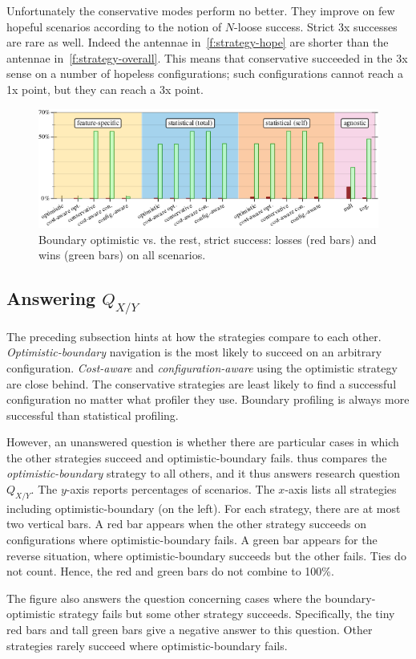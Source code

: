 Unfortunately the conservative modes perform no better.  They improve on few
hopeful scenarios according to the notion of $N$-loose success.  Strict 3x
successes are rare as well.  Indeed the antennae in~\cref{f:strategy-hope}
are shorter than the antennae in~\cref{f:strategy-overall}.  This means that
conservative succeeded in the 3x sense on a number of hopeless configurations;
such configurations cannot reach a 1x point, but they can reach a 3x point.


\begin{figure}[ht]
  \includegraphics[width=0.9\columnwidth]{data/head-to-head.pdf}
  \caption{Boundary optimistic vs. the rest, strict success: losses (red bars) and wins (green bars) on all scenarios.}
  \label{f:head-to-head}
\end{figure}

\subsection{Answering $Q_{X/Y}$} \label{subsec:hh} \label{s:hh}

The preceding subsection hints at how the strategies compare to each other.
\emph{Optimistic-boundary} navigation is the most likely to succeed on an
arbitrary configuration.  \emph{Cost-aware} and \emph{configuration-aware} using
the optimistic strategy are close behind.  The conservative strategies are least
likely to find a successful configuration no matter what profiler they use.
Boundary profiling is always more successful than statistical profiling.

However,
an unanswered question is whether there are particular cases in which the other
strategies succeed and optimistic-boundary fails.
 thus compares the \emph{optimistic-boundary} strategy to all
others, and it thus answers research question $Q_{X/Y}$.  The $y$-axis reports
percentages of scenarios.  The $x$-axis lists all strategies including
optimistic-boundary (on the left).  For each strategy, there are at most two
vertical bars.  A red bar appears when the other strategy succeeds on
configurations where optimistic-boundary fails.  A green bar appears for the
reverse situation, where optimistic-boundary succeeds but the other fails.  Ties
do not count.  Hence, the red and green bars do not combine to 100\%.

The figure also answers the question concerning cases where the
boundary-optimistic strategy fails but some other strategy succeeds.
Specifically, the tiny red bars and tall green bars give a negative answer to
this question.  Other strategies rarely succeed where optimistic-boundary fails.

